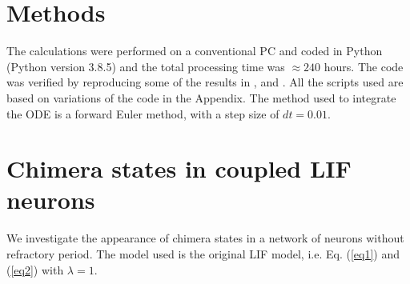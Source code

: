 \documentclass[a4paper,12pt]{article}
\begin{document}
\section{Methods}
The calculations were performed on a conventional PC and coded in Python (Python version 3.8.5) and the total processing time was $\approx 240$ hours. The code was verified by reproducing some of the results in \cite{tsigkrimulti}, \cite{tsigkrimulti2} and \cite{tsigkrichim}. All the scripts used are based on variations of the code in the Appendix. The method used to integrate the ODE is a forward Euler method, with a step size of $dt = 0.01$.

\section{Chimera states in coupled LIF neurons}
We investigate the appearance of chimera states in a network of neurons without refractory period. The model used is the original LIF model, i.e. Eq. (\ref{eq1}) and (\ref{eq2}) with $\lambda = 1$.
\end{document}
